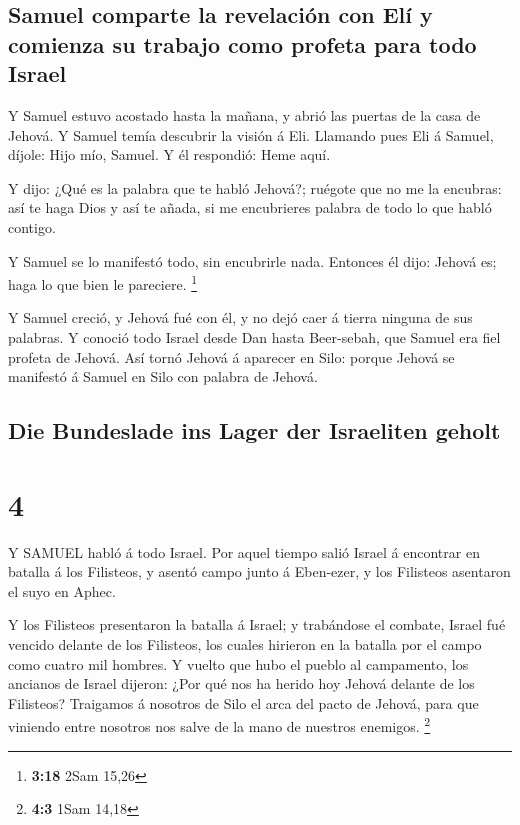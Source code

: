 \hypertarget{samuel-comparte-la-revelaciuxf3n-con-eluxed-y-comienza-su-trabajo-como-profeta-para-todo-israel}{%
\subsection{Samuel comparte la revelación con Elí y comienza su trabajo
como profeta para todo
Israel}\label{samuel-comparte-la-revelaciuxf3n-con-eluxed-y-comienza-su-trabajo-como-profeta-para-todo-israel}}

 Y Samuel estuvo acostado hasta la mañana, y abrió las
puertas de la casa de Jehová. Y Samuel temía descubrir la visión á Eli.
 Llamando pues Eli á Samuel, díjole: Hijo mío, Samuel. Y él
respondió: Heme aquí.

 Y dijo: ¿Qué es la palabra que te habló Jehová?; ruégote
que no me la encubras: así te haga Dios y así te añada, si me
encubrieres palabra de todo lo que habló contigo.

 Y Samuel se lo manifestó todo, sin encubrirle nada.
Entonces él dijo: Jehová es; haga lo que bien le pareciere. \footnote{\textbf{3:18}
  2Sam 15,26}

 Y Samuel creció, y Jehová fué con él, y no dejó caer á
tierra ninguna de sus palabras.  Y conoció todo Israel
desde Dan hasta Beer-sebah, que Samuel era fiel profeta de Jehová.
 Así tornó Jehová á aparecer en Silo: porque Jehová se
manifestó á Samuel en Silo con palabra de Jehová.

\hypertarget{die-bundeslade-ins-lager-der-israeliten-geholt}{%
\subsection{Die Bundeslade ins Lager der Israeliten
geholt}\label{die-bundeslade-ins-lager-der-israeliten-geholt}}

\hypertarget{section-3}{%
\section{4}\label{section-3}}

 Y SAMUEL habló á todo Israel. Por aquel tiempo salió Israel
á encontrar en batalla á los Filisteos, y asentó campo junto á
Eben-ezer, y los Filisteos asentaron el suyo en Aphec.

 Y los Filisteos presentaron la batalla á Israel; y
trabándose el combate, Israel fué vencido delante de los Filisteos, los
cuales hirieron en la batalla por el campo como cuatro mil hombres.
 Y vuelto que hubo el pueblo al campamento, los ancianos de
Israel dijeron: ¿Por qué nos ha herido hoy Jehová delante de los
Filisteos? Traigamos á nosotros de Silo el arca del pacto de Jehová,
para que viniendo entre nosotros nos salve de la mano de nuestros
enemigos. \footnote{\textbf{4:3} 1Sam 14,18}

